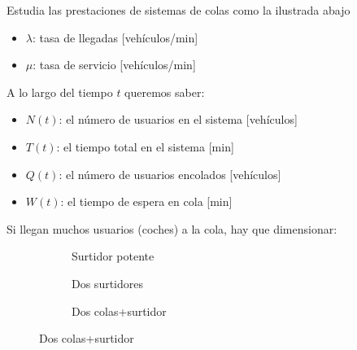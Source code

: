 \documentclass[xcolor={x11names}]{beamer}
\begin{document}
\begin{frame}{\secname}
    Estudia las prestaciones de sistemas
    de colas como la ilustrada abajo

    \begin{figure}
        
    \end{figure}

    \begin{itemize}
        \item $\lambda$: tasa de llegadas
            [vehículos/min]
        \item $\mu$: tasa de servicio
            [vehículos/min]
    \end{itemize}
\end{frame}




\begin{frame}{\secname}
    

    \begin{figure}
        
    \end{figure}
    A lo largo del tiempo $t$ queremos saber:

    \begin{itemize}
        \item $N(t)$: el número de usuarios
            en el sistema [vehículos]
        \item $T(t)$: el tiempo total en
            el sistema
            [min]
        \item $Q(t)$: el número de usuarios
            encolados [vehículos]
        \item $W(t)$: el tiempo de espera
            en cola [min]
    \end{itemize}
\end{frame}









\begin{frame}{\secname}
    Si llegan muchos usuarios (coches)
    a la cola, hay que dimensionar:


    \begin{figure}
     \centering
     \begin{subfigure}[b]{0.3\textwidth}
         \centering
         \resizebox{\textwidth}{!}{%
         }
         \caption{Surtidor potente}
     \end{subfigure}
     \hfill
     \begin{subfigure}[b]{0.3\textwidth}
         \centering
         \resizebox{\textwidth}{!}{%
         }
         \caption{Dos surtidores}
     \end{subfigure}
     \hfill
     \begin{subfigure}[b]{0.3\textwidth}
         \centering
         \resizebox{\textwidth}{!}{%
         }
         \caption{Dos colas+surtidor}
     \end{subfigure}
    \end{figure}

\end{frame}
\end{document}
